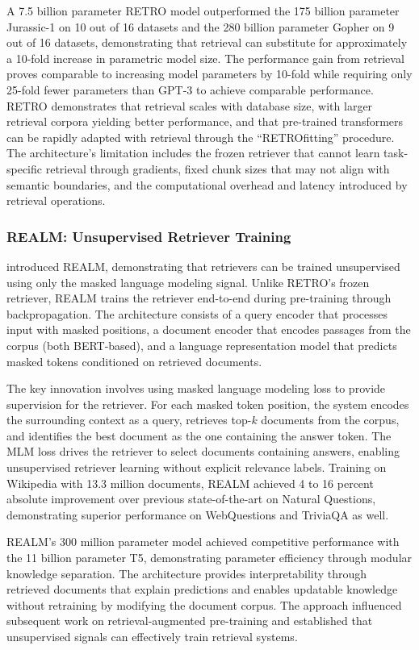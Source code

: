 A 7.5 billion parameter RETRO model outperformed the 175 billion parameter Jurassic-1 on 10 out of 16 datasets and the 280 billion parameter Gopher on 9 out of 16 datasets, demonstrating that retrieval can substitute for approximately a 10-fold increase in parametric model size. The performance gain from retrieval proves comparable to increasing model parameters by 10-fold while requiring only 25-fold fewer parameters than GPT-3 to achieve comparable performance. RETRO demonstrates that retrieval scales with database size, with larger retrieval corpora yielding better performance, and that pre-trained transformers can be rapidly adapted with retrieval through the ``RETROfitting'' procedure. The architecture's limitation includes the frozen retriever that cannot learn task-specific retrieval through gradients, fixed chunk sizes that may not align with semantic boundaries, and the computational overhead and latency introduced by retrieval operations.

\subsubsection{REALM: Unsupervised Retriever Training}

\citet{guu2020realm} introduced REALM, demonstrating that retrievers can be trained unsupervised using only the masked language modeling signal. Unlike RETRO's frozen retriever, REALM trains the retriever end-to-end during pre-training through backpropagation. The architecture consists of a query encoder that processes input with masked positions, a document encoder that encodes passages from the corpus (both BERT-based), and a language representation model that predicts masked tokens conditioned on retrieved documents.

The key innovation involves using masked language modeling loss to provide supervision for the retriever. For each masked token position, the system encodes the surrounding context as a query, retrieves top-$k$ documents from the corpus, and identifies the best document as the one containing the answer token. The MLM loss drives the retriever to select documents containing answers, enabling unsupervised retriever learning without explicit relevance labels. Training on Wikipedia with 13.3 million documents, REALM achieved 4 to 16 percent absolute improvement over previous state-of-the-art on Natural Questions, demonstrating superior performance on WebQuestions and TriviaQA as well.

REALM's 300 million parameter model achieved competitive performance with the 11 billion parameter T5, demonstrating parameter efficiency through modular knowledge separation. The architecture provides interpretability through retrieved documents that explain predictions and enables updatable knowledge without retraining by modifying the document corpus. The approach influenced subsequent work on retrieval-augmented pre-training and established that unsupervised signals can effectively train retrieval systems.

